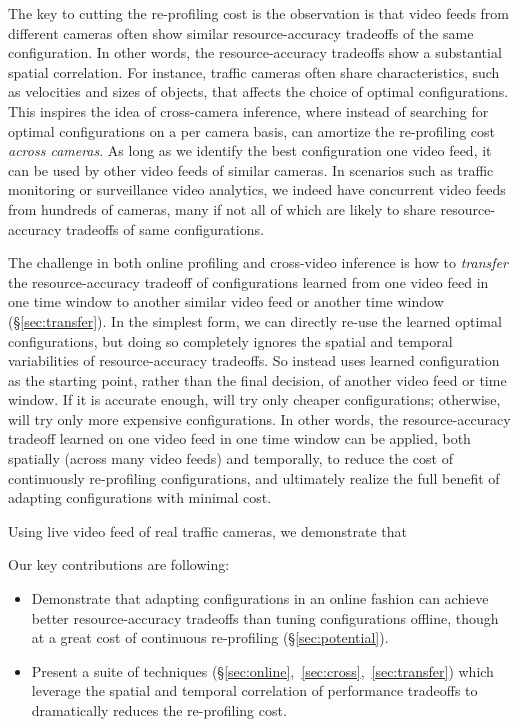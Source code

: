 The key to cutting the re-profiling cost is the observation is that 
video feeds from different cameras often show similar 
resource-accuracy tradeoffs of the same configuration.
In other words, the resource-accuracy tradeoffs show a substantial
spatial correlation.
For instance, traffic cameras often share characteristics, such as 
velocities and sizes of objects, that affects the choice of optimal
\nn configurations.
This inspires the idea of cross-camera inference, where instead of 
searching for optimal configurations on a per camera basis, \name 
can amortize the re-profiling cost {\em across cameras}.
As long as we identify the best configuration one video feed, it 
can be used by other video feeds of similar cameras.
In scenarios such as traffic monitoring or surveillance video 
analytics, we indeed have concurrent video feeds from hundreds of 
cameras, many if not all of which are likely to share 
resource-accuracy tradeoffs of same configurations.

The challenge in both online profiling and cross-video inference
is how to {\em transfer} the resource-accuracy tradeoff of \nn 
configurations learned from one video feed in one time window to 
another similar video feed or another time window 
(\S\ref{sec:transfer}).
In the simplest form, we can directly re-use the learned optimal \nn
configurations, but doing so completely ignores the spatial and 
temporal variabilities of resource-accuracy tradeoffs.
So instead \name uses learned \nn configuration as the starting 
point, rather than the final decision, of another video feed or time
window.
If it is accurate enough, \name will try only cheaper configurations; 
otherwise, \name will try only more expensive configurations.
In other words, the resource-accuracy tradeoff learned on one video
feed in one time window can be applied, both spatially (across many
video feeds) and temporally, to reduce the cost of continuously 
re-profiling \nn configurations, and ultimately realize the full
benefit of adapting \nn configurations with minimal cost.

Using live video feed of \fillme real traffic cameras, we demonstrate
that 


Our key contributions are following:
\begin{itemize}
    \item Demonstrate that adapting \nn configurations in an online 
    fashion can achieve better resource-accuracy tradeoffs than 
    tuning configurations offline, though at a great cost of continuous 
    re-profiling (\S\ref{sec:potential}).
    \item Present a suite of techniques 
    (\S\ref{sec:online},~\ref{sec:cross},~\ref{sec:transfer}) which 
    leverage the spatial and temporal correlation of performance 
    tradeoffs to dramatically reduces the re-profiling cost.
\end{itemize}

